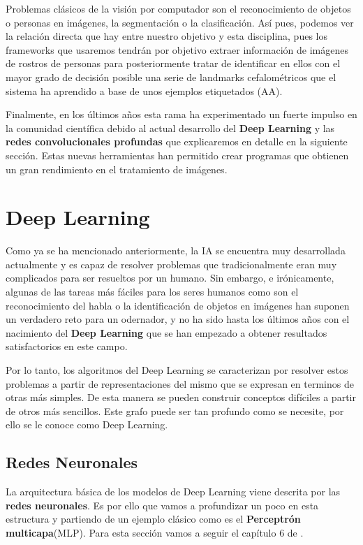     \medskip
    
    \noindent Problemas clásicos de la visión por computador son el reconocimiento de objetos o personas en imágenes, la segmentación o la clasificación. Así pues, podemos ver la relación directa que hay entre nuestro objetivo y esta disciplina, pues los frameworks que usaremos tendrán por objetivo extraer información de imágenes de rostros de personas para posteriormente tratar de identificar en ellos con el mayor grado de decisión posible una serie de landmarks cefalométricos que el sistema ha aprendido a base de unos ejemplos etiquetados (AA).

    \medskip

    \noindent Finalmente, en los últimos años esta rama ha experimentado un fuerte impulso en la comunidad científica debido al actual desarrollo del \textbf{Deep Learning} y las \textbf{redes convolucionales profundas} que explicaremos en detalle en la siguiente sección. Estas nuevas herramientas han permitido crear programas que obtienen un gran rendimiento en el tratamiento de imágenes.

\section{Deep Learning}
    Como ya se ha mencionado anteriormente, la IA se encuentra muy desarrollada actualmente y es capaz de resolver problemas que tradicionalmente eran muy complicados para ser resueltos por un humano. Sin embargo, e irónicamente, algunas de las tareas más fáciles para los seres humanos como son el reconocimiento del habla o la identificación de objetos en imágenes han suponen un verdadero reto para un odernador, y no ha sido hasta los últimos años con el nacimiento del \textbf{Deep Learning} que se han empezado a obtener resultados satisfactorios en este campo.

    \medskip
    
    \noindent Por lo tanto, los algoritmos del Deep Learning se caracterizan por resolver estos problemas a partir de representaciones del mismo que se expresan en terminos de otras más simples. De esta manera se pueden construir conceptos difíciles a partir de otros más sencillos. Este grafo puede ser tan profundo como se necesite, por ello se le conoce como Deep Learning.

    \subsection{Redes Neuronales} \label{sub:redes_neuronales}
        La arquitectura básica de los modelos de Deep Learning viene descrita por las \textbf{redes neuronales}. Es por ello que vamos a profundizar un poco en esta estructura y partiendo de un ejemplo clásico como es el \textbf{Perceptrón multicapa}(MLP). Para esta sección vamos a seguir el capítulo 6 de \cite{Goodfellow-et-al-2016}.

